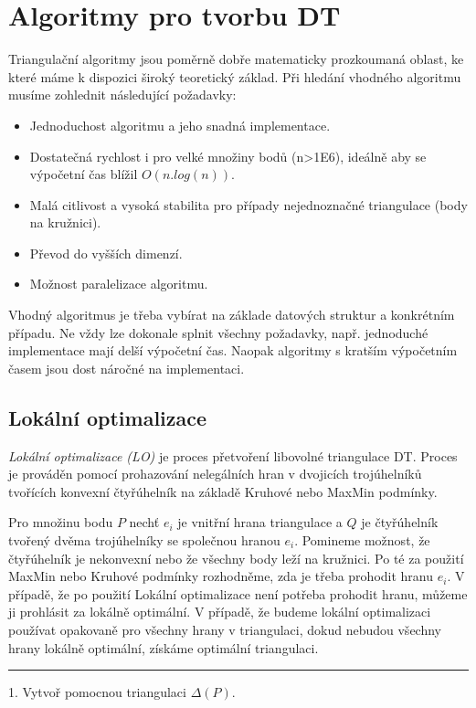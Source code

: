 \documentclass[12pt,a4paper]{article}
\begin{document}
\section{Algoritmy pro tvorbu DT}
Triangulační algoritmy jsou poměrně dobře matematicky prozkoumaná oblast, ke které máme k dispozici široký teoretický základ. Při hledání vhodného algoritmu musíme zohlednit následující požadavky:
\begin{itemize}
\item Jednoduchost algoritmu a jeho snadná implementace.
\item Dostatečná rychlost i pro velké množiny bodů (n>1E6), ideálně aby se výpočetní čas blížil $O(n . log(n))$.
\item Malá citlivost a vysoká stabilita pro případy nejednoznačné triangulace (body na kružnici).
\item Převod do vyšších dimenzí.
\item Možnost paralelizace algoritmu.
\end{itemize}
Vhodný algoritmus je třeba vybírat na základe datových struktur a konkrétním případu. Ne vždy lze dokonale splnit všechny požadavky, např. jednoduché implementace mají delší výpočetní čas. Naopak algoritmy s kratším výpočetním časem jsou dost náročné na implementaci.

\subsection{Lokální optimalizace}
\emph{Lokální optimalizace (LO)} je proces přetvoření libovolné triangulace DT. Proces je prováděn pomocí prohazování nelegálních hran v dvojicích trojúhelníků tvořících konvexní čtyřúhelník na základě Kruhové nebo MaxMin podmínky.

Pro množinu bodu $P$ nechť $e_i$ je vnitřní hrana triangulace a $Q$ je čtyřúhelník tvořený dvěma trojúhelníky se společnou hranou $e_i$. Pomineme možnost, že čtyřúhelník je nekonvexní nebo že všechny body leží na kružnici. Po té za použití MaxMin nebo Kruhové podmínky rozhodněme, zda je třeba prohodit hranu $e_i$. V případě, že po použití Lokální optimalizace není potřeba prohodit hranu, můžeme ji prohlásit za lokálně optimální. V případě, že  budeme lokální optimalizaci používat opakovaně pro všechny hrany v triangulaci, dokud nebudou všechny hrany lokálně optimální, získáme optimální triangulaci.



\hrule
1. Vytvoř pomocnou triangulaci $\Delta(P)$.
\end{document}
